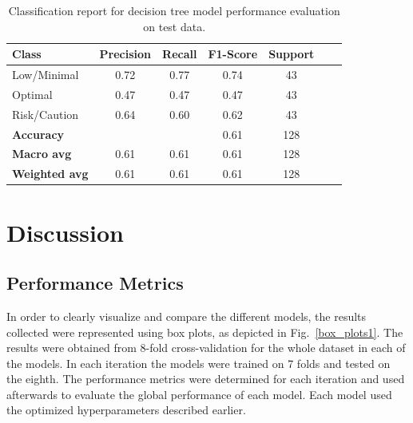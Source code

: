 \documentclass[conference]{IEEEtran}
\begin{document}
\begin{table}[H]
\centering
\caption{Classification report for decision tree model performance evaluation on test data.}
\label{cr_dtree_test}
\begin{tabular}{lcccccc}
\toprule
\textbf{Class} & \textbf{Precision} & \textbf{Recall} & \textbf{F1-Score} & \textbf{Support} \\
\midrule
Low/Minimal & 0.72 & 0.77 & 0.74 & 43 \\
Optimal & 0.47 & 0.47 & 0.47 & 43 \\
Risk/Caution & 0.64 & 0.60 & 0.62 & 43 \\
\midrule
\textbf{Accuracy} &  &  & 0.61 & 128 \\
\textbf{Macro avg} & 0.61 & 0.61 & 0.61 & 128 \\
\textbf{Weighted avg} & 0.61 & 0.61 & 0.61 & 128 \\
\bottomrule
\end{tabular}
\end{table} %



\section{Discussion} \label{discussion_sec}

\subsection{Performance Metrics}

In order to clearly visualize and compare the different models, the results collected were represented using box plots, as depicted in Fig.~\ref{box_plots1}.
The results were obtained from 8-fold cross-validation for the whole dataset in each of the models. In each iteration the models were trained on 7 folds and tested on the eighth. The performance metrics were determined for each iteration and used afterwards to evaluate the global performance of each model. Each model used the optimized hyperparameters described earlier.
\end{document}

